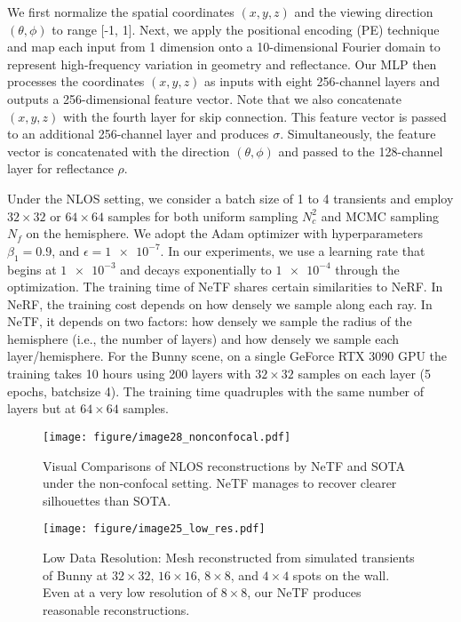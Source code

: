 \documentclass[10pt,journal,compsoc]{IEEEtran}
\begin{document}
We first normalize the spatial coordinates $(x,y,z)$ and the viewing direction $(\theta,\phi)$ to range [-1, 1]. Next, we apply the positional encoding (PE) technique and map each input from 1 dimension onto a 10-dimensional Fourier domain to represent high-frequency variation in geometry and reflectance. Our MLP then processes the coordinates $(x,y,z)$ as inputs with eight 256-channel layers and outputs a 256-dimensional feature vector. Note that we also concatenate $(x,y,z)$ with the fourth layer for skip connection. This feature vector is passed to an additional 256-channel layer and produces $\sigma$. Simultaneously, the feature vector is concatenated with the direction $(\theta,\phi)$ and passed to the 128-channel layer for reflectance $\rho$.
 
Under the NLOS setting, we consider a batch size of 1 to 4 transients and employ $32 \times 32$ or $64 \times 64$ samples for both uniform sampling $N_c^2$ and MCMC sampling $N_f$ on the hemisphere. We adopt the Adam optimizer \cite{2015Adam} with hyperparameters $\beta_{1}=0.9$, and $\epsilon = \num{1e-7}$. In our experiments, we use a learning rate that begins at $\num{1e-3}$ and decays exponentially to $\num{1e-4}$ through the optimization. The training time of NeTF shares certain similarities to NeRF. In NeRF, the training cost depends on how densely we sample along each ray. In NeTF, it depends on two factors: how densely we sample the radius of the hemisphere (i.e., the number of layers) and how densely we sample each layer/hemisphere. For the Bunny scene, on a single GeForce RTX 3090 GPU the training takes 10 hours using 200 layers with $32\times32$ samples on each layer (5 epochs, batchsize 4). The training time quadruples with the same number of layers but at $64\times64$ samples.



\begin{figure*}[htbp]
\centering
\texttt{[image: figure/image28\_nonconfocal.pdf]}
\caption{Visual Comparisons of NLOS reconstructions by NeTF and SOTA under the non-confocal setting. NeTF manages to recover clearer silhouettes than SOTA.}
\label{nonconfocal}
\end{figure*}

\begin{figure}[!t]
\centering
\texttt{[image: figure/image25\_low\_res.pdf]}
\caption{Low Data Resolution: Mesh reconstructed from simulated transients of Bunny at $32\times32$, $16\times16$, $8\times8$, and $4 \times4$ spots on the wall. Even at a very low resolution of $8 \times8$, our NeTF produces reasonable reconstructions. }
\label{LowDataResolution}
\end{figure}
 
\end{document}
